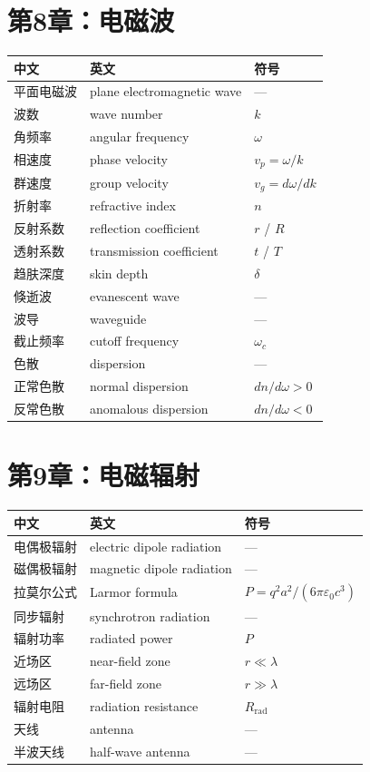 \documentclass[11pt,a4paper,openany,oneside]{book}
\newcommand{\eps}{\varepsilon}
\begin{document}
\section{第8章：电磁波}

\begin{center}
\begin{tabular}{@{}lll@{}}
\toprule
\textbf{中文} & \textbf{英文} & \textbf{符号} \\
\midrule
平面电磁波 & plane electromagnetic wave & — \\
波数 & wave number & $k$ \\
角频率 & angular frequency & $\omega$ \\
相速度 & phase velocity & $v_p=\omega/k$ \\
群速度 & group velocity & $v_g=d\omega/dk$ \\
折射率 & refractive index & $n$ \\
反射系数 & reflection coefficient & $r$ / $R$ \\
透射系数 & transmission coefficient & $t$ / $T$ \\
趋肤深度 & skin depth & $\delta$ \\
倏逝波 & evanescent wave & — \\
波导 & waveguide & — \\
截止频率 & cutoff frequency & $\omega_c$ \\
色散 & dispersion & — \\
正常色散 & normal dispersion & $dn/d\omega>0$ \\
反常色散 & anomalous dispersion & $dn/d\omega<0$ \\
\bottomrule
\end{tabular}
\end{center}

\section{第9章：电磁辐射}

\begin{center}
\begin{tabular}{@{}lll@{}}
\toprule
\textbf{中文} & \textbf{英文} & \textbf{符号} \\
\midrule
电偶极辐射 & electric dipole radiation & — \\
磁偶极辐射 & magnetic dipole radiation & — \\
拉莫尔公式 & Larmor formula & $P=q^2a^2/(6\pi\eps_0 c^3)$ \\
同步辐射 & synchrotron radiation & — \\
辐射功率 & radiated power & $P$ \\
近场区 & near-field zone & $r\ll\lambda$ \\
远场区 & far-field zone & $r\gg\lambda$ \\
辐射电阻 & radiation resistance & $R_{\text{rad}}$ \\
天线 & antenna & — \\
半波天线 & half-wave antenna & — \\
\bottomrule
\end{tabular}
\end{center}
\end{document}

